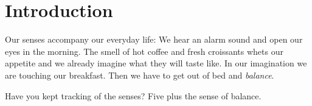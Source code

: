 \chapter{Introduction}\label{sec:introduction}

Our senses accompany our everyday life: We hear an alarm sound and open our eyes in the morning. The smell of hot coffee and fresh croissants whets our appetite and we already imagine what they will taste like. In our imagination we are touching our breakfast. Then we have to get out of bed and \textit{balance}. 

Have you kept tracking of the senses? Five plus the sense of balance.